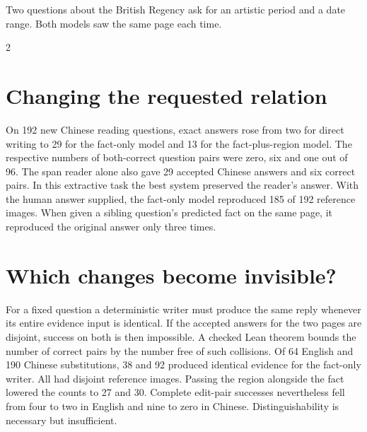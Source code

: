\newpage
{}
\noindent Two questions about the British Regency ask for an artistic period and a date range. Both models saw the same page each time.
\begin{multicols}{2}
\section*{Changing the requested relation}
On 192 new Chinese reading questions, exact answers rose from two for direct writing to 29 for the fact-only model and 13 for the fact-plus-region model. The respective numbers of both-correct question pairs were zero, six and one out of 96. The span reader alone also gave 29 accepted Chinese answers and six correct pairs. In this extractive task the best system preserved the reader's answer. With the human answer supplied, the fact-only model reproduced 185 of 192 reference images. When given a sibling question's predicted fact on the same page, it reproduced the original answer only three times.
\section*{Which changes become invisible?}
For a fixed question a deterministic writer must produce the same reply whenever its entire evidence input is identical. If the accepted answers for the two pages are disjoint, success on both is then impossible. A checked Lean theorem bounds the number of correct pairs by the number free of such collisions. Of 64 English and 190 Chinese substitutions, 38 and 92 produced identical evidence for the fact-only writer. All had disjoint reference images. Passing the region alongside the fact lowered the counts to 27 and 30. Complete edit-pair successes nevertheless fell from four to two in English and nine to zero in Chinese. Distinguishability is necessary but insufficient.

\end{multicols}
